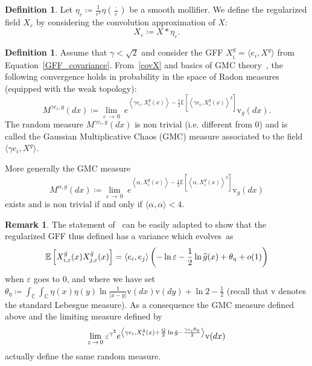 \documentclass[10pt]{amsart}
\theoremstyle{definition}\newtheorem{defi}[theo]{Definition}\newtheorem{rema}[theo]{Remark}\newtheorem{exam}[theo]{Example}\newtheorem{exem}[theo]{Example}\newtheorem{nota}[theo]{Notation}
\newcommand{\rmv}{\mathrm{v}}
\newcommand{\C}{\mathbb{C}}
\newcommand{\ps}[1]{\langle #1 \rangle}
\newcommand*\eps{\varepsilon}
\newcommand{\norm}[1]{\left\lvert#1\right\rvert}
\newcommand{\expect}[1]{\mathbb{E}\left[#1\right]}
\let\oldhat\hat
\renewcommand*{\hat}[1]{\mathchoice{\widehat{#1}}{\widehat{#1}}{\oldhat{#1}}{\oldhat{#1}}}
\begin{document}
\begin{defi}
Let $\eta_\eps\coloneqq \frac1{\eps^2}\eta(\frac{\cdot}{\eps})$ be a smooth mollifier. We define the regularized field $X_\eps$ by considering the convolution approximation of $X$:
\begin{equation}
X_\eps\coloneqq X*\eta_\eps.
\end{equation}
\end{defi}

\begin{defi}
Assume that $\gamma<\sqrt 2$ and consider the GFF $X^g_i=\langle e_i, X^{g} \rangle$ from Equation~\eqref{GFF_covariance}. From~\eqref{covX} and basics of GMC theory~\cite{review}, the following convergence holds in probability in the space of Radon measures (equipped with the weak topology):
\begin{equation}
M^{\gamma e_i, g}(dx)\coloneqq \underset{\eps \,\to\,0}{\lim} \: e^{\left\langle\gamma e_i, X^{g}_\eps(x)\right\rangle-\frac12\expect{\left\langle\gamma e_i, X^{g}_\eps(x)\right\rangle^2}} \rmv_{g}(dx).
\end{equation}
The random measure $M^{\gamma e_i,g}(dx) $ is non trivial (i.e. different from $0$) and is called the Gaussian Multiplicative Chaos (GMC) measure associated to the field $\langle\gamma e_i, X^{g} \rangle$.
\end{defi}

More generally the GMC measure
\begin{equation*}
M^{\alpha,g}(dx)\coloneqq \underset{\eps\,\to\,0}{\lim} \: e^{\left\langle\alpha, X^{g}_\eps(x) \right\rangle-\frac12\expect{\left\langle\alpha, X^{g}_\eps(x)\right\rangle^2}} \rmv_g(dx)
\end{equation*}
exists and is non trivial if and only if $\ps{\alpha,\alpha}< 4$.

\begin{rema}
The statement of~\cite[Proposition~(2.5)]{DKRV} can be easily adapted to show that the regularized GFF thus defined has a variance which evolves~as
\[
\expect{X^{\hat g}_{i, \eps}(x)X^{\hat g}_{j, \eps}(x)}=\ps{e_i,e_j}\left(-\ln\eps-\frac12\ln\hat g(x)+\theta_{\eta}+o(1)\right)
\]
when $\eps$ goes to $0$, and where we have set $\theta_{\eta}\coloneqq \int_\C\int_\C\eta(x)\eta(y)\ln\frac{1}{\norm{x-y}}\rmv(dx)\rmv(dy)+\ln 2-\frac12$ (recall that $\rmv$ denotes the standard Lebesgue measure). As a consequence the GMC measure defined above and the limiting measure defined by
\[
\underset{\eps\,\to\,0}{\lim} \: \eps^{\gamma^2}e^{\left\langle\gamma e_i, X^{\hat g}_\eps(x) +\frac Q2\ln\hat g-\frac{\gamma e_i\theta_{\eta}}2 \right\rangle}\rmv(dx)
\]
actually define the same random measure.
\end{rema}
\end{document}
